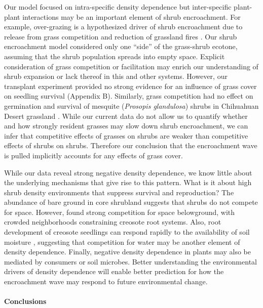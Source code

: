 \documentclass[11pt]{article}\usepackage[]{graphicx}\usepackage[usenames,dvipsnames]{xcolor}
\begin{document}
Our model focused on intra-specific density dependence but inter-specific plant-plant interactions may be an important element of shrub encroachment.
For example, over-grazing is a hypothesized driver of shrub encroachment due to release from grass competition and reduction of grassland fires \citep{van2000shrub}. 
Our shrub encroachment model considered only one ``side'' of the grass-shrub ecotone, assuming that the shrub population spreads into empty space. 
Explicit consideration of grass competition or facilitation may enrich our understanding of shrub expansion or lack thereof in this and other systems. 
However, our transplant experiment provided no strong evidence for an influence of grass cover on seedling survival (Appendix B).
Similarly, grass competition had no effect on germination and survival of mesquite (\textit{Prosopis glandulosa}) shrubs in Chihuahuan Desert grassland \citep{weber2022woody}. 
While our current data do not allow us to quantify whether and how strongly resident grasses may slow down shrub encroachment, we can infer that competitive effects of grasses on shrubs are weaker than competitive effects of shrubs on shrubs. 
Therefore our conclusion that the encroachment wave is pulled implicitly accounts for any effects of grass cover. 

While our data reveal strong negative density dependence, we know little about the underlying mechanisms that give rise to this pattern. 
What is it about high shrub density environments that suppress survival and reproduction?
The abundance of bare ground in core shrubland suggests that shrubs do not compete for space. 
However, \cite{brisson1994effect} found strong competition for space belowground, with crowded neighborhoods constraining creosote root systems. 
Also, root development of creosote seedlings can respond rapidly to the availability of soil moisture \citep{obrist2003increasing}, suggesting that competition for water may be another element of density dependence. 
Finally, negative density dependence in plants may also be mediated by consumers or soil microbes. 
Better understanding the environmental drivers of density dependence will enable better prediction for how the encroachment wave may respond to future environmental change.

\paragraph{Conclusions}
\end{document}
